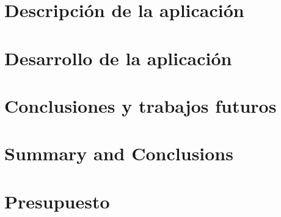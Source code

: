 \documentclass[spanish,a4paper,11pt,twoside]{report}
\begin{document}
\chapter{Descripción de la aplicaci\'on}
\label{chapter:tres}



\newpage{\pagestyle{empty}\cleardoublepage}
\thispagestyle{empty}


\chapter{Desarrollo de la aplicaci\'on}
\label{chapter:cuatro}



\newpage{\pagestyle{empty}\cleardoublepage}
\thispagestyle{empty}

\chapter{Conclusiones y trabajos futuros}
\label{chapter:Conclusiones}



\newpage{\pagestyle{empty}\cleardoublepage}
\thispagestyle{empty}
 
\chapter{Summary and Conclusions } 
\label{chapter:ingles}



\newpage{\pagestyle{empty}\cleardoublepage}
\thispagestyle{empty}

\chapter{Presupuesto}
\label{chapter:Presupuesto}




\end{document}
